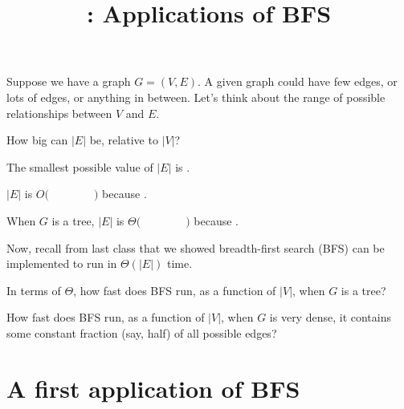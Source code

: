 \documentclass{tufte-handout}
\title{\thecourse: Applications of BFS}
\date{}
\begin{document}
\maketitle

Suppose we have a graph $G = (V,E)$.  A given graph could have few
edges, or lots of edges, or anything in between.  Let's think about
the range of possible relationships between $V$ and $E$.

\begin{questions}
  \item How big can $|E|$ be, relative to $|V|$?
  \begin{subquestions}
  \item The smallest possible value of $|E|$ is \blank.
  \item $|E|$ is $O\Big( \qquad\qquad \Big)$ because \blank.
  \item When $G$ is a tree, $|E|$ is $\Theta\Big( \qquad\qquad \Big)$
    because \blank.
  \end{subquestions}
\end{questions}

Now, recall from last class that we showed breadth-first search (BFS) can
be implemented to run in $\Theta(|E|)$ time.

\begin{questions}
\item In terms of $\Theta$, how fast does BFS run, as a function of
  $|V|$, when $G$ is a tree?
\item How fast does BFS run, as a function of $|V|$, when $G$ is very
  dense, \ie it contains some constant fraction (say, half) of all
  possible edges?
\end{questions}

\newpage
\section{A first application of BFS}
\end{document}
